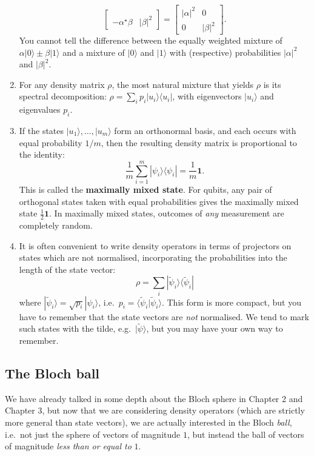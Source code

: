 \documentclass[fleqn]{article}
\begin{document}
\begin{enumerate}
\[\begin{bmatrix}
     \\-\alpha^\star\beta & |\beta|^2
     \end{bmatrix}
     =
     \begin{bmatrix}
       |\alpha|^2 & 0
     \\0 & |\beta|^2
     \end{bmatrix}.
   \]
  You cannot tell the difference between the equally weighted mixture of \(\alpha|0\rangle\pm\beta|1\rangle\) and a mixture of \(|0\rangle\) and \(|1\rangle\) with (respective) probabilities \(|\alpha|^2\) and \(|\beta|^2\).
\item
  For any density matrix \(\rho\), the most natural mixture that yields \(\rho\) is its spectral decomposition: \(\rho=\sum_i p_i|u_i\rangle\langle u_i|\), with eigenvectors \(|u_i\rangle\) and eigenvalues \(p_i\).
\item
  If the states \(|u_1\rangle,\ldots,|u_m\rangle\) form an orthonormal basis, and each occurs with equal probability \(1/m\), then the resulting density matrix is proportional to the identity:
  \[
     \frac{1}{m}\sum_{i=1}^m |\psi_i\rangle\langle\psi_i|
     = \frac{1}{m}\mathbf{1}.
   \]
  This is called the \textbf{maximally mixed state}.
  For qubits, any pair of orthogonal states taken with equal probabilities gives the maximally mixed state \(\frac12\mathbf{1}\).
  In maximally mixed states, outcomes of \emph{any} measurement are completely random.
\item
  It is often convenient to write density operators in terms of projectors on states which are not normalised, incorporating the probabilities into the length of the state vector:
  \[
     \rho = \sum_i|\widetilde\psi_i\rangle\langle\widetilde\psi_i|
   \]
  where \(|\widetilde\psi_i\rangle = \sqrt{p_i}|\psi_i\rangle\), i.e.~\(p_i=\langle\widetilde\psi_i|\widetilde\psi_i\rangle\).
  This form is more compact, but you have to remember that the state vectors are \emph{not} normalised.
  We tend to mark such states with the tilde, e.g.~\(|\widetilde\psi\rangle\), but you may have your own way to remember.
\end{enumerate}

\hypertarget{the-bloch-ball}{%
\subsection{The Bloch ball}\label{the-bloch-ball}}

We have already talked in some depth about the Bloch sphere in \protect\hypertarget{qubits}{}{Chapter 2} and \protect\hypertarget{quantum-gates}{}{Chapter 3}, but now that we are considering density operators (which are strictly more general than state vectors), we are actually interested in the Bloch \emph{ball}, i.e.~not just the sphere of vectors of magnitude \(1\), but instead the ball of vectors of magnitude \emph{less than or equal to} \(1\).
\end{document}
